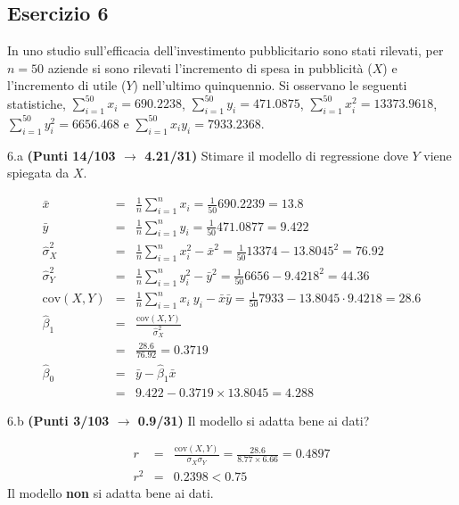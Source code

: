 \documentclass[
  11pt,
]{book}
\theoremstyle{mytheoremstyle}
\theoremstyle{mydefstyle}
\newenvironment{sol}
  {
  \begin{tcolorbox}[enhanced,breakable,arc=0.1mm,boxrule=1pt,colback=white,colframe=iblue,
  title=\bf \fontfamily{lmss}\selectfont \hspace{.5 cm} Soluzione,drop fuzzy shadow]

}{
\end{tcolorbox}
  }
\begin{document}
\subsection{Esercizio 6}\label{esercizio-6-23}

In uno studio sull'efficacia dell'investimento pubblicitario sono stati rilevati, per \(n=50\) aziende si sono rilevati l'incremento di spesa in
pubblicità (\(X\)) e l'incremento di utile (\(Y\)) nell'ultimo quinquennio. Si osservano le seguenti statistiche, \(\sum_{i=1}^{50}x_i=690.2238\), \(\sum_{i=1}^{50}y_i=471.0875\),
\(\sum_{i=1}^{50}x_i^2=13373.9618\), \(\sum_{i=1}^{50}y_i^2=6656.468\) e \(\sum_{i=1}^{50}x_iy_i=7933.2368\).

6.a \textbf{(Punti 14/103 \(\rightarrow\) 4.21/31)} Stimare il modello di regressione dove \(Y\) viene spiegata da \(X\).

\begin{sol}
\begin{eqnarray*}
           \bar x &=&\frac 1 n\sum_{i=1}^n x_i = \frac {1}{ 50 }  690.2239 =  13.8 \\
           \bar y &=&\frac 1 n\sum_{i=1}^n y_i = \frac {1}{ 50 }  471.0877 =  9.422 \\
           \hat\sigma_X^2&=&\frac 1 n\sum_{i=1}^n x_i^2-\bar x^2=\frac {1}{ 50 }  13374  - 13.8045 ^2= 76.92 \\
           \hat\sigma_Y^2&=&\frac 1 n\sum_{i=1}^n y_i^2-\bar y^2=\frac {1}{ 50 }  6656  - 9.4218 ^2= 44.36 \\
           \text{cov}(X,Y)&=&\frac 1 n\sum_{i=1}^n x_i~y_i-\bar x\bar y=\frac {1}{ 50 }  7933 - 13.8045 \cdot 9.4218 = 28.6 \\
           \hat\beta_1 &=& \frac{\text{cov}(X,Y)}{\hat\sigma_X^2} \\
                    &=& \frac{ 28.6 }{ 76.92 }  =  0.3719 \\
           \hat\beta_0 &=& \bar y - \hat\beta_1 \bar x\\
                    &=&  9.422 - 0.3719 \times  13.8045 = 4.288 
         \end{eqnarray*}

\end{sol}

6.b \textbf{(Punti 3/103 \(\rightarrow\) 0.9/31)} Il modello si adatta bene ai dati?

\begin{sol}
\begin{eqnarray*}
r&=&\frac{\text{cov}(X,Y)}{\sigma_X\sigma_Y}=\frac{ 28.6 }{ 8.77 \times 6.66 }= 0.4897 \\r^2&=& 0.2398 < 0.75
\end{eqnarray*}
Il modello \textbf{non} si adatta bene ai dati.

\end{sol}
\end{document}

